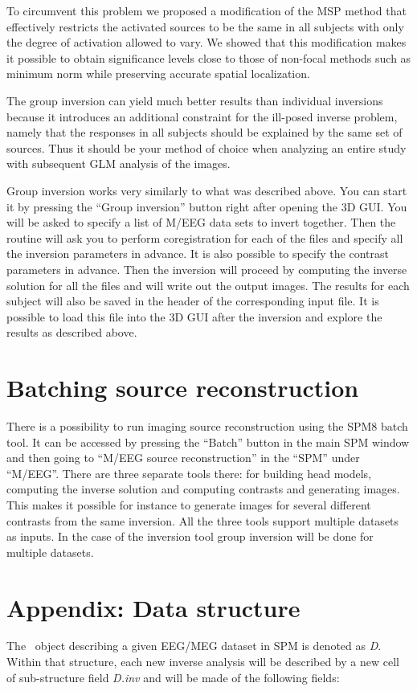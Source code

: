 To circumvent this problem we proposed a modification of the MSP method \cite{vl_group} that effectively restricts the activated sources to be the same in all subjects with only the degree of activation allowed to vary. We showed that this modification makes it possible to obtain significance levels close to those of non-focal methods such as minimum norm while preserving accurate spatial localization.

The group inversion can yield much better results than individual inversions because it introduces an additional constraint for the ill-posed inverse problem, namely that the responses in all subjects should be explained by the same set of sources. Thus it should be your method of choice when analyzing an entire study with subsequent GLM analysis of the images.

Group inversion works very similarly to what was described above. You can start it by pressing the ``Group inversion'' button right after opening the 3D GUI. You will be asked to specify a list of M/EEG data sets to invert together. Then the routine will ask you to perform coregistration for each of the files and specify all the inversion parameters in advance. It is also possible to specify the contrast parameters in advance. Then the inversion will proceed by computing the inverse solution for all the files and will write out the output images. The results for each subject will also be saved in the header of the corresponding input file. It is possible to load this file into the 3D GUI after the inversion and explore the results as described above.

\section{Batching source reconstruction}
There is a possibility to run imaging source reconstruction using the SPM8 batch tool. It can be accessed by pressing the ``Batch'' button in the main SPM window and then going to ``M/EEG source reconstruction'' in the ``SPM'' under ``M/EEG''. There are three separate tools there: for building head models, computing the inverse solution and computing contrasts and generating images. This makes it possible for instance to generate images for several different contrasts from the same inversion. All the three tools support multiple datasets as inputs. In the case of the inversion tool group inversion will be done for multiple datasets.

\section{Appendix: Data structure}
The \matlab\ object describing a given EEG/MEG dataset in SPM is denoted as \textit{D}.
Within that structure, each new inverse analysis will be described by a new cell of sub-structure
field \textit{D.inv} and will be made of the following fields:

